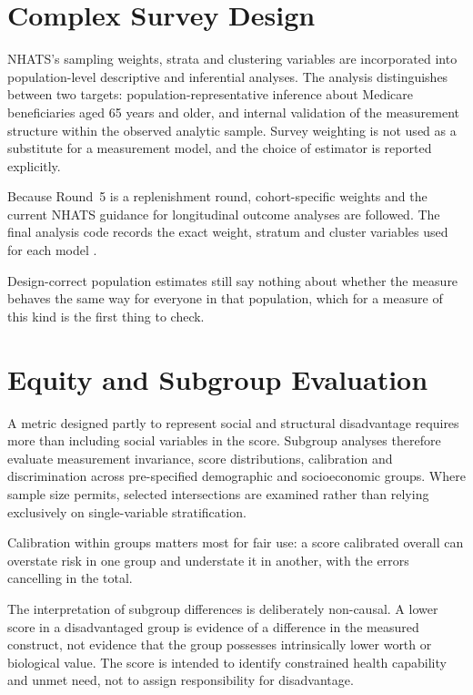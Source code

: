\section{Complex Survey Design}
\label{sec:surveydesign}

NHATS's sampling weights, strata and clustering variables are incorporated into population-level descriptive and inferential analyses. The analysis distinguishes between two targets: population-representative inference about Medicare beneficiaries aged 65 years and older, and internal validation of the measurement structure within the observed analytic sample. Survey weighting is not used as a substitute for a measurement model, and the choice of estimator is reported explicitly.

Because Round~5 is a replenishment round, cohort-specific weights and the current NHATS guidance for longitudinal outcome analyses are followed. The final analysis code records the exact weight, stratum and cluster variables used for each model \citep{nhats_methods_2026}.

Design-correct population estimates still say nothing about whether the measure behaves the same way for everyone in that population, which for a measure of this kind is the first thing to check.

\section{Equity and Subgroup Evaluation}
\label{sec:equity}

A metric designed partly to represent social and structural disadvantage requires more than including social variables in the score. Subgroup analyses therefore evaluate measurement invariance, score distributions, calibration and discrimination across pre-specified demographic and socioeconomic groups. Where sample size permits, selected intersections are examined rather than relying exclusively on single-variable stratification.

Calibration within groups matters most for fair use: a score calibrated overall can overstate risk in one group and understate it in another, with the errors cancelling in the total.

The interpretation of subgroup differences is deliberately non-causal. A lower score in a disadvantaged group is evidence of a difference in the measured construct, not evidence that the group possesses intrinsically lower worth or biological value. The score is intended to identify constrained health capability and unmet need, not to assign responsibility for disadvantage.

